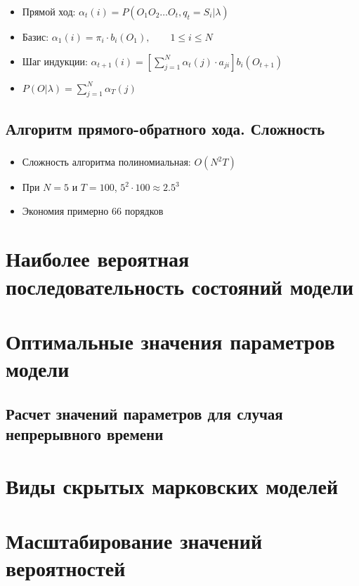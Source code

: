 \documentclass{beamer}
\begin{document}
\begin{frame} 
  \frametitle{\insertsection}
  \framesubtitle{\insertsubsection}
  \begin{itemize}
  \item Прямой ход: $ \alpha_t(i) = P(O_1 O_2 \ldots O_t, q_t = S_i | \lambda)$
    \pause
  \item Базис: $ \alpha_1(i) = \pi_i \cdot b_i(O_1), \qquad 1 \le i \le N$
  \item Шаг индукции: $\displaystyle \alpha_{t + 1}(i) = \left [ \sum_{j = 1}^{N} \alpha_t(j) \cdot a_{ji} \right ] b_i(O_{t + 1})$
    \pause
  \item $\displaystyle P(O|\lambda) = \sum_{j = 1}^{N} \alpha_T(j)$
  \end{itemize}
\end{frame}


\subsection{Алгоритм прямого-обратного хода. Сложность}

\begin{frame} 
  \frametitle{\insertsection}
  \framesubtitle{\insertsubsection}
  \begin{itemize}
  \item Сложность алгоритма полиномиальная: $O(N^2T)$
    \pause
  \item При $N = 5$ и  $T = 100$, $5^2 \cdot 100 \approx 2.5^3$ \pause
    \item Экономия примерно $66$ порядков
  \end{itemize}
\end{frame}

\section{Наиболее вероятная последовательность состояний модели}

\section{Оптимальные значения параметров модели}
\subsection{Расчет значений параметров для случая непрерывного времени}

\section{Виды скрытых марковских моделей}

\section{Масштабирование значений вероятностей}
\end{document}
